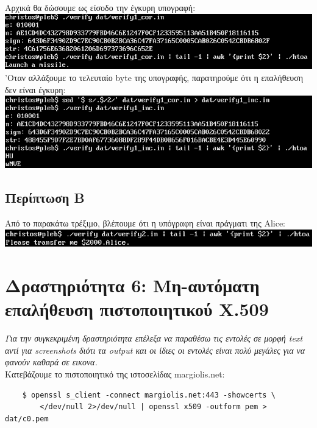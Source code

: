 \documentclass[12pt]{article}
\begin{document}
Αρχικά θα δώσουμε ως είσοδο την έγκυρη υπογραφή: \\

\includegraphics[width=\textwidth]{res/verify1.png} \\

'Οταν αλλάξουμε το τελευταίο byte της υπογραφής, παρατηρούμε ότι η επαλήθευση
δεν είναι έγκυρη: \\

\includegraphics[width=\textwidth]{res/verify2.png} \\

\subsection{Περίπτωση Β}

Από το παρακάτω τρέξιμο, βλέπουμε ότι η υπόγραφη είναι πράγματι της Alice: \\

\includegraphics[width=\textwidth]{res/verify3.png} \\

\section{Δραστηριότητα 6: Μη-αυτόματη επαλήθευση πιστοποιητικού X.509}

\textit{Για την συγκεκριμένη δραστηριότητα επέλεξα να παραθέσω τις εντολές σε μορφή
text αντί για screenshots διότι τα output και οι ίδιες οι εντολές είναι πολύ
μεγάλες για να φανούν καθαρά σε εικονα.} \\

Κατεβάζουμε το πιστοποιητικό της ιστοσελίδας margiolis.net:
\begin{lstlisting}
	$ openssl s_client -connect margiolis.net:443 -showcerts \
		</dev/null 2>/dev/null | openssl x509 -outform pem > dat/c0.pem
\end{lstlisting}
\end{document}
